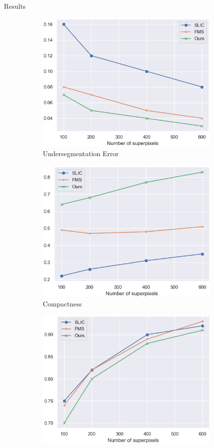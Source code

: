 \documentclass[9pt]{beamer}
\begin{document}
\begin{frame}{Results}
\begin{figure}[!ht]
    \centering
    \begin{subfigure}{.45\linewidth}
        \centering
        \includegraphics[width=.8\linewidth]{pics/UE.png}
    \caption{Undersegmentation Error}
    \end{subfigure}
    \begin{subfigure}{.45\linewidth}
        \centering
        \includegraphics[width=.8\linewidth]{pics/CO.png}
    \caption{Compactness}
    \end{subfigure}
    \begin{subfigure}{.45\linewidth}
        \centering
        \includegraphics[width=.8\linewidth]{pics/BR.png}

\end{subfigure}
\end{figure}
\end{frame}
\end{document}
